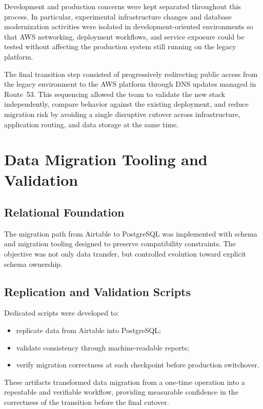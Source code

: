 Development and production concerns were kept separated throughout this process. In particular, experimental infrastructure changes and database modernization activities were isolated in development-oriented environments so that AWS networking, deployment workflows, and service exposure could be tested without affecting the production system still running on the legacy platform.

The final transition step consisted of progressively redirecting public access from the legacy environment to the AWS platform through DNS updates managed in Route~53. This sequencing allowed the team to validate the new stack independently, compare behavior against the existing deployment, and reduce migration risk by avoiding a single disruptive cutover across infrastructure, application routing, and data storage at the same time.

\section{Data Migration Tooling and Validation}
\subsection{Relational Foundation}
The migration path from Airtable to PostgreSQL was implemented with schema and migration tooling designed to preserve compatibility constraints. The objective was not only data transfer, but controlled evolution toward explicit schema ownership.

\subsection{Replication and Validation Scripts}
Dedicated scripts were developed to:
\begin{itemize}
    \item replicate data from Airtable into PostgreSQL;
    \item validate consistency through machine-readable reports;
    \item verify migration correctness at each checkpoint before production switchover.
\end{itemize}

These artifacts transformed data migration from a one-time operation into a repeatable and verifiable workflow, providing measurable confidence in the correctness of the transition before the final cutover.
